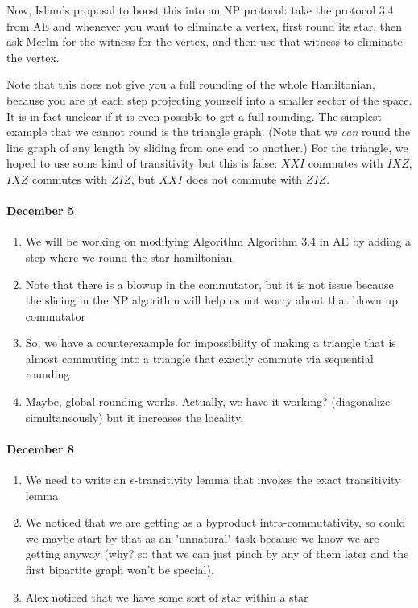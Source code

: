 \documentclass[11pt]{article}
\theoremstyle{plain}
\begin{document}
Now, Islam's proposal to boost this into an NP protocol: take the protocol 3.4 from AE and whenever you want to eliminate a vertex, first round its star, then ask Merlin for the witness for the vertex, and then use that witness to eliminate the vertex. 

Note that this does not give you a full rounding of the whole Hamiltonian, because you are at each step projecting yourself into a smaller sector of the space. It is in fact unclear if it is even possible to get a full rounding. The simplest example that we cannot round is the triangle graph. (Note that we \emph{can} round the line graph of any length by sliding from one end to another.) For the triangle, we hoped to use some kind of transitivity but this is false: $XXI$ commutes with $IXZ$, $IXZ$ commutes with $ZIZ$, but $XXI$ does not commute with $ZIZ$.

\paragraph{December 5}
\begin{enumerate}
    \item We will be working on modifying Algorithm Algorithm 3.4 in AE by adding a step where we round the star hamiltonian.
    \item Note that there is a blowup in the commutator, but it is not issue because the slicing in the NP algorithm will help us not worry about that blown up commutator
    \item So, we have a counterexample for impossibility of making a triangle that is almost commuting into a triangle that exactly commute via sequential rounding
    \item Maybe, global rounding works. Actually, we have it working? (diagonalize simultaneously) but it increases the locality.
    
\end{enumerate}

\paragraph{December 8}
\begin{enumerate}
    \item We need to write an $\epsilon$-transitivity lemma that invokes the exact transitivity lemma.
    \item We noticed that we are getting as a byproduct intra-commutativity, so could we maybe start by that as an "unnatural" task because we know we are getting anyway (why? so that we can just pinch by any of them later and the first bipartite graph won't be special).
    \item Alex noticed that we have some sort of star within a star
\end{enumerate}
\end{document}

